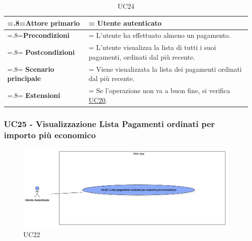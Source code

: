             \begin{table}[H]
                \centering
                \renewcommand{\arraystretch}{1.8}
                \renewcommand\tabularxcolumn[1]{m{#1}}
                \begin{tabularx}{0.9\textwidth} {
                    >{\hsize=.8\hsize\linewidth=\hsize}X
                    >{\hsize=1.2\hsize\linewidth=\hsize}X}
                    \hline
                    \textbf{Attore primario} & Utente autenticato \\
                    \hline
                    \textbf{Precondizioni} & L'utente ha effettuato almeno un pagamento. \\
                    \hline
                    \textbf{Postcondizioni} & L'utente visualizza la lista di tutti i suoi pagamenti, ordinati dal più recente. \\
                    \hline
                    \textbf{Scenario principale} & Viene visualizzata la lista dei pagamenti ordinati dal più recente. \\
                    \hline
                    \textbf{Estensioni} & Se l'operazione non va a buon fine, si verifica \hyperref[UC20]{UC20}. \\
                    \hline
                \end{tabularx}
                \caption{UC24}
            \end{table}

        \subsubsection{UC25 - Visualizzazione Lista Pagamenti ordinati per importo più economico}
        \label{UC25}

        \begin{figure}[H]
            \centering
            \includegraphics[scale=0.4]{src/img/UC25.png}
            \caption{UC22}
        \end{figure}

